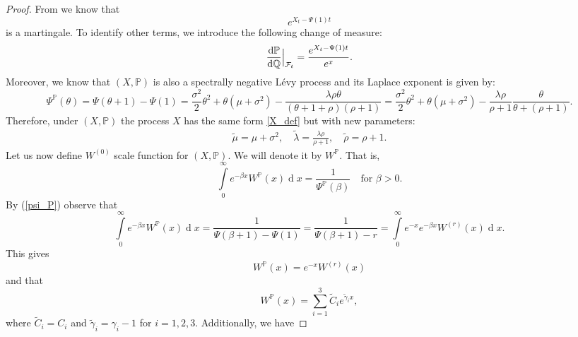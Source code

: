 \documentclass[10pt,a4paper]{amsart}
\def\P{{\mathbb{P}}}
\def\Q{{\mathbb{Q}}}
\def \F{{\mathcal{F}}}
\newcommand{\dx}{\operatorname{d}\!}
\def\P{{\mathbb P}} \def\le{\left} \def\ri{\right} \def\i{\infty}
\begin{document}
\begin{proof}
			From \cite{kyprianou2} we know that
			\begin{equation*}
				e^{X_t - \Psi(1)t}
			\end{equation*}
			is a martingale. To identify other terms, we introduce the following change of measure:
			\begin{equation*}
				\frac{\dx \mathbb{P}}{\dx \Q} \Big{|} _{\F_t} = \frac{e^{X_t - \Psi(1)t}}{e^x}.
			\end{equation*}
			Moreover, we know that $(X, \mathbb{P})$ is also a spectrally negative L\'evy process and its Laplace exponent is given by:
			\begin{equation}\label{psi_P}
				\Psi^\mathbb{P}(\theta) = \Psi(\theta+1) - \Psi(1)=\frac{\sigma^2}{2}\theta^2 + \theta(\mu + \sigma^2) - \frac{\lambda\rho\theta}{(\theta+1+\rho)(\rho+1)} = \frac{\sigma^2}{2}\theta^2 + \theta(\mu + \sigma^2) - \frac{\lambda\rho}{\rho+1}\frac{\theta}{\theta+(\rho+1)}.
			\end{equation}
			Therefore, under $(X,\P)$ the process $X$ has the same form \eqref{X_def} but with new parameters:
			\begin{align*}
				\tilde{\mu} = \mu + \sigma^2,\quad
				\tilde{\lambda} = \frac{\lambda\rho}{\rho+1},\quad
				\tilde{\rho} = \rho +1.
			\end{align*}
			Let us now define $W^{(0)}$ scale function for $(X, \mathbb{P})$. We will denote it by $W^\mathbb{P}$. That is,
			\begin{equation*}
				\int\limits_0^\infty e^{-\beta x}W^{\mathbb{P}}(x)\dx x = \frac{1}{\Psi^{\mathbb{P}}(\beta)} \quad \text{for $\beta>0$}.
			\end{equation*}
			By (\ref{psi_P}) observe that
			\begin{equation*}
				\int\limits_0^\infty e^{-\beta x}W^{\mathbb{P}}(x)\dx x = \frac{1}{\Psi(\beta + 1) - \Psi(1)} =  \frac{1}{\Psi(\beta + 1) - r} = \int\limits_0^\infty e^{-x}e^{-\beta x}W^{(r)}(x)\dx x.
			\end{equation*}
			This gives
			\begin{equation*}
				W^{\mathbb{P}}(x) = e^{-x}W^{(r)}(x)
			\end{equation*}
			and that
			\begin{equation}\label{W_P}
				W^{\P}(x) = \sum_{i=1}^3 \tilde{C}_i e^{\tilde{\gamma}_i x},
			\end{equation}
			where $\tilde{C}_i = C_i$ and $\tilde{\gamma}_i = \gamma_i - 1$ for $i=1,2,3$.
			Additionally, we have

\end{proof}
\end{document}

